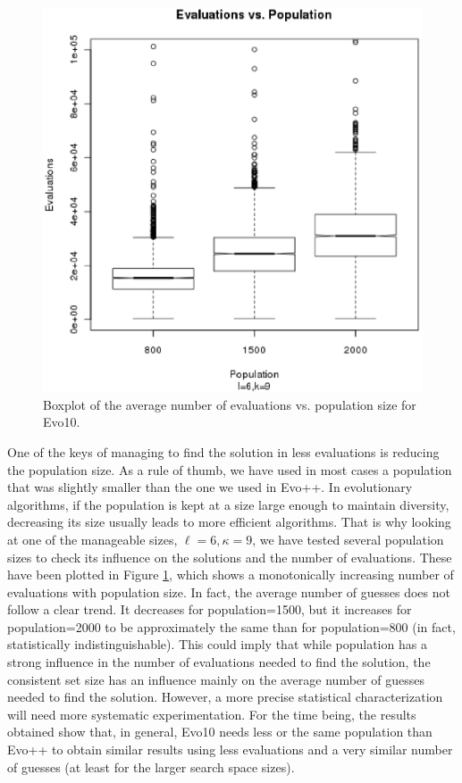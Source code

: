 \documentclass[conference]{IEEEtran}
\begin{document}
%
\begin{figure}[!h]
\centering
\includegraphics[scale=0.50]{eval-vs-pop.eps}
\caption{Boxplot of the average number of evaluations 
  vs. population size for Evo10.  \label{fig:eval:pop}}
\end{figure} 
%
One of the keys of managing to find the solution in less evaluations
is reducing the population size. As a rule of thumb, we have used in
most cases a population that was slightly smaller than the one we used
in Evo++. In evolutionary algorithms, if the population is kept at a
size large enough to maintain diversity, decreasing its size usually
leads to more efficient algorithms. That is why looking at one of the
manageable sizes, $\ell=6, \kappa=9$, we have tested several
population sizes to check its influence on the solutions and the
number of evaluations. These have been plotted in Figure
\ref{fig:eval:pop}, which shows a monotonically increasing number of
evaluations with population size. In fact, the average number of
guesses does not follow a clear trend. It decreases for
population=1500, but it increases for population=2000 to be
approximately the same than for population=800 (in fact, statistically
indistinguishable). This could imply that while population has a
strong influence in the number of evaluations needed to find the
solution, the consistent set size has an influence mainly on the
average number of guesses needed to find the solution. However, a more
precise statistical characterization will need more systematic
experimentation. For the time being, the results obtained show that,
in general, Evo10 needs less or the same population than Evo++ to
obtain similar results using less evaluations and a very similar number of
guesses (at least for the larger search space sizes). 
\end{document}
